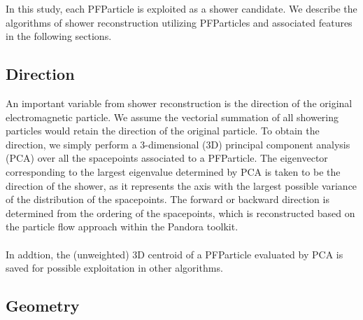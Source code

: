 In this study, each PFParticle is exploited as a shower candidate.
We describe the algorithms of shower reconstruction 
utilizing PFParticles and associated features in the following sections.\\

\subsection{Direction}
\label{sec:shr_direction}

An important variable from shower reconstruction is the direction of the 
original electromagnetic particle.
We assume the vectorial summation of all showering particles 
would retain the direction of the original particle.
To obtain the direction,
we simply perform a 3-dimensional (3D) principal component 
analysis (PCA) over all the spacepoints associated to a PFParticle.
The eigenvector corresponding to the largest eigenvalue determined by
PCA is taken to be the direction of the shower, as it represents the axis
with the largest possible variance of the distribution of the spacepoints.
The forward or backward direction is determined from the ordering of
the spacepoints, which is reconstructed based on the particle flow approach
within the Pandora toolkit.\\
\\
In addtion, the (unweighted) 3D centroid of a PFParticle evaluated
by PCA is saved for possible exploitation in other algorithms.\\

\subsection{Geometry}
\label{sec:shr_geometry}

